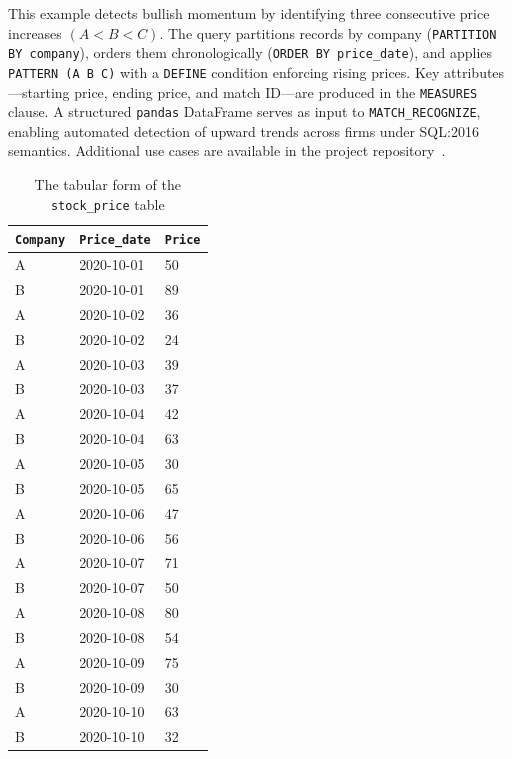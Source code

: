 This example detects bullish momentum by identifying three consecutive
price increases $(A < B < C)$.  The query partitions records by company
(\texttt{PARTITION BY company}), orders them chronologically
(\texttt{ORDER BY price\_date}), and applies \texttt{PATTERN (A B C)}
with a \texttt{DEFINE} condition enforcing rising prices.  Key
attributes---starting price, ending price, and match ID---are produced
in the \texttt{MEASURES} clause.  A structured \texttt{pandas} DataFrame
serves as input to \texttt{MATCH\_RECOGNIZE}, enabling automated
detection of upward trends across firms under SQL:2016 semantics.
Additional use cases are available in the project
repository~\cite{monierashraf2025rowmatch}.

\begin{table}[H]
  \centering
  \caption[Stock price table]{The tabular form of the \texttt{stock\_price} table}
  \label{tab:stock_price}
  \begin{tabular}{@{}lll@{}}
    \toprule
    \texttt{Company} & \texttt{Price\_date} & \texttt{Price} \\
    \midrule
    A & 2020-10-01 & 50 \\
    B & 2020-10-01 & 89 \\
    A & 2020-10-02 & 36 \\
    B & 2020-10-02 & 24 \\
    A & 2020-10-03 & 39 \\
    B & 2020-10-03 & 37 \\
    A & 2020-10-04 & 42 \\
    B & 2020-10-04 & 63 \\
    A & 2020-10-05 & 30 \\
    B & 2020-10-05 & 65 \\
    A & 2020-10-06 & 47 \\
    B & 2020-10-06 & 56 \\
    A & 2020-10-07 & 71 \\
    B & 2020-10-07 & 50 \\
    A & 2020-10-08 & 80 \\
    B & 2020-10-08 & 54 \\
    A & 2020-10-09 & 75 \\
    B & 2020-10-09 & 30 \\
    A & 2020-10-10 & 63 \\
    B & 2020-10-10 & 32 \\
    \bottomrule
  \end{tabular}
\end{table}

